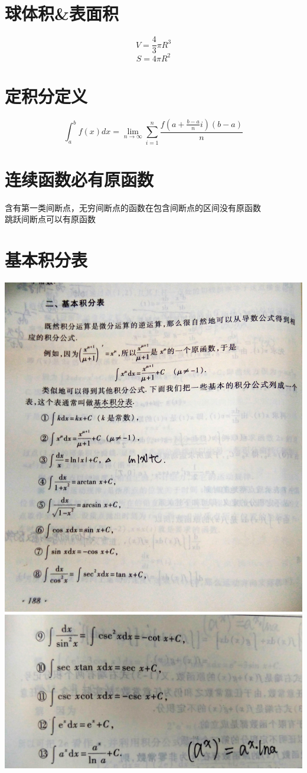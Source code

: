 \documentclass[UTF8]{ctexart}
\begin{document}
\section{球体积\&表面积}
$$ V=\frac{4}{3} \pi R^3$$
$$ S= 4 \pi R^2$$

\section{定积分定义}
$$ \int_a^b f(x)dx= \lim_{n \rightarrow \infty } \sum_{i=1}^n \frac{f \left( a+ \frac{b-a}{n}i \right)(b-a)}{n}$$
\section{连续函数必有原函数}
含有第一类间断点，无穷间断点的函数在包含间断点的区间没有原函数   \\
跳跃间断点可以有原函数 \\

\section{基本积分表}
\includegraphics[width=14cm]{9345E7/9476215E0863B8FB681EC9D2BB921BDB.jpg}
\includegraphics[width=14cm]{9345E7/4FEE9C843E57935F87D1E16F255FA43E.jpg}
\end{document}
